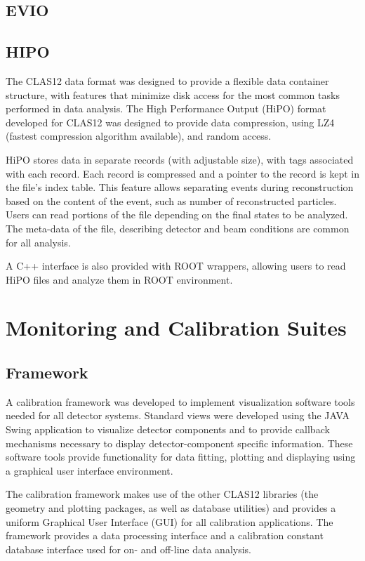 \documentclass{elsart}
\begin{document}
\subsection{EVIO}

\subsection{HIPO}

The CLAS12 data format was designed to provide a flexible data container structure,
 with features that minimize disk
access for the most common tasks performed in data analysis. 
The High Performance Output (HiPO)
format developed for CLAS12 was designed to provide data compression, using LZ4 (fastest compression algorithm available), 
and random access. 

HiPO stores data in separate records (with adjustable size), with tags associated with each record. Each record is
compressed and a pointer to the record is kept in the file's index table. This feature allows separating events during
reconstruction based on the content of the event, such as number of reconstructed particles. Users can read portions
of the file depending on the final states to be analyzed.  The meta-data of the file, describing detector and
beam conditions are common for all analysis.

A C++ interface is also provided with ROOT wrappers, allowing users to read HiPO files and analyze them in ROOT
environment.

\section{Monitoring and Calibration Suites}

\subsection{Framework}

A calibration framework was developed to implement visualization software tools needed for all detector 
systems. Standard views were developed using the JAVA Swing application to visualize detector components and to provide callback
mechanisms necessary to display detector-component specific information.  These software tools provide 
functionality for data fitting, plotting and displaying using a graphical user interface environment. 

The calibration framework makes use of the other CLAS12 libraries 
(the geometry and plotting packages, as well as database utilities) and provides a uniform Graphical User
Interface (GUI) for all calibration applications. The framework provides a data processing interface  
and a calibration constant database interface used
for on- and off-line data analysis.   
\end{document}
